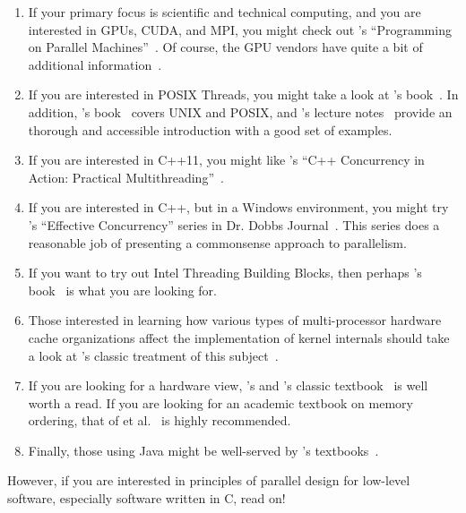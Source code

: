 \begin{enumerate}
\item	If your primary focus is scientific and technical computing,
	and you are interested in GPUs, CUDA, and MPI, you
	might check out 's ``Programming on
	Parallel Machines''~\cite{NormMatloff2017ParProcBook}.
	Of course, the GPU vendors have quite a bit of additional
	information~\cite{AMD2020ROCm,CyrilZeller2011GPGPUbasics,NVidia2017GPGPU,NVidia2017GPGPU-university}.
\item	If you are interested in POSIX Threads, you might take
	a look at 's book~\cite{Butenhof1997pthreads}.
	In addition,
	's book~\cite{WRichardStevens1992}
	covers UNIX and POSIX, and 's lecture
	notes~\cite{StewartWeiss2013UNIX} provide an
	thorough and accessible introduction with a good set of
	examples.
\item	If you are interested in C++11, you might like
	's ``C++ Concurrency in Action: Practical
	Multithreading''~\cite{AnthonyWilliams2012}.
\item	If you are interested in C++, but in a Windows environment,
	you might try 's ``Effective Concurrency''
	series in
	Dr. Dobbs Journal~\cite{HerbSutter2008EffectiveConcurrency}.
	This series does a reasonable job of presenting a
	commonsense approach to parallelism.
\item	If you want to try out Intel Threading Building Blocks,
	then perhaps 's book~\cite{Reinders2007Textbook}
	is what you are looking for.
\item	Those interested in learning how various types of multi-processor
	hardware
	cache organizations affect the implementation of kernel
	internals should take a look at 's classic
	treatment of this subject~\cite{Schimmel:1994:USM:175689}.
\item	If you are looking for a hardware view, 's and
	's classic
	textbook~\cite{Hennessy2011} is well worth a read.
	If you are looking for an academic textbook on memory ordering,
	that of  et al.~\cite{DanielJSorin2011MemModel}
	is highly recommended.
\item	Finally, those using Java might be well-served by 's
	textbooks~\cite{DougLea1997Textbook,Goetz2007Textbook}.
\end{enumerate}

However, if you are interested in principles of parallel design
for low-level software, especially software written in C, read on!

